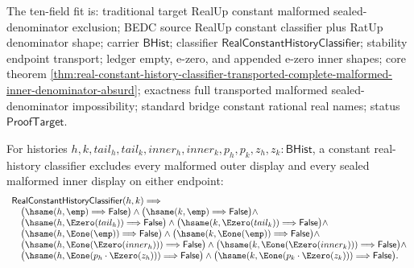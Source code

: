 The ten-field fit is: traditional target RealUp constant malformed
sealed-denominator exclusion; BEDC source RealUp constant classifier plus RatUp
denominator shape; carrier $\mathsf{BHist}$; classifier
$\mathsf{RealConstantHistoryClassifier}$; stability endpoint transport; ledger
empty, e-zero, and appended e-zero inner shapes; core theorem
\autoref{thm:real-constant-history-classifier-transported-complete-malformed-inner-denominator-absurd};
exactness full transported malformed sealed-denominator impossibility;
standard bridge constant rational real names; status $\mathsf{ProofTarget}$.

\begin{theorem}
\label{thm:real-constant-history-classifier-full-malformed-endpoint-exclusion-package}
For histories
$h,k,tail_h,tail_k,inner_h,inner_k,p_h,p_k,z_h,z_k:\mathsf{BHist}$, a
constant real-history classifier excludes every malformed outer display and
every sealed malformed inner display on either endpoint:
$$
\begin{array}{l}
\mathsf{RealConstantHistoryClassifier}(h,k)\Longrightarrow\\
\quad
\bigl(\hsame(h,\emp)\Longrightarrow\mathsf{False}\bigr)
\land
\bigl(\hsame(k,\emp)\Longrightarrow\mathsf{False}\bigr)
\land\\
\quad
\bigl(\hsame(h,\Ezero(tail_h))\Longrightarrow\mathsf{False}\bigr)
\land
\bigl(\hsame(k,\Ezero(tail_k))\Longrightarrow\mathsf{False}\bigr)
\land\\
\quad
\bigl(\hsame(h,\Eone(\emp))\Longrightarrow\mathsf{False}\bigr)
\land
\bigl(\hsame(k,\Eone(\emp))\Longrightarrow\mathsf{False}\bigr)
\land\\
\quad
\bigl(\hsame(h,\Eone(\Ezero(inner_h)))\Longrightarrow\mathsf{False}\bigr)
\land
\bigl(\hsame(k,\Eone(\Ezero(inner_k)))\Longrightarrow\mathsf{False}\bigr)
\land\\
\quad
\bigl(\hsame(h,\Eone(p_h\cdot\Ezero(z_h)))\Longrightarrow\mathsf{False}\bigr)
\land
\bigl(\hsame(k,\Eone(p_k\cdot\Ezero(z_k)))\Longrightarrow\mathsf{False}\bigr).
\end{array}
$$
\end{theorem}
